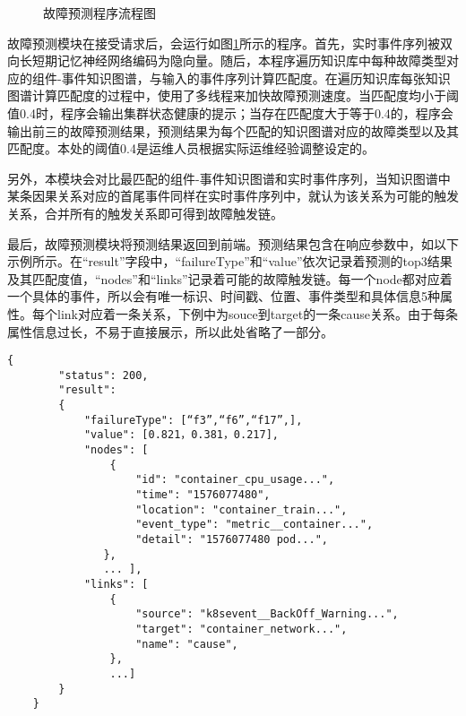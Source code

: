\begin{figure}[H]
    \centering
    \caption{故障预测程序流程图\label{failure-predict-process}}
\end{figure}

故障预测模块在接受请求后，会运行如图\ref{failure-predict-process}所示的程序。首先，实时事件序列被双向长短期记忆神经网络编码为隐向量。随后，本程序遍历知识库中每种故障类型对应的组件-事件知识图谱，与输入的事件序列计算匹配度。在遍历知识库每张知识图谱计算匹配度的过程中，使用了多线程来加快故障预测速度。当匹配度均小于阈值0.4时，程序会输出集群状态健康的提示；当存在匹配度大于等于0.4的，程序会输出前三的故障预测结果，预测结果为每个匹配的知识图谱对应的故障类型以及其匹配度。本处的阈值0.4是运维人员根据实际运维经验调整设定的。

另外，本模块会对比最匹配的组件-事件知识图谱和实时事件序列，当知识图谱中某条因果关系对应的首尾事件同样在实时事件序列中，就认为该关系为可能的触发关系，合并所有的触发关系即可得到故障触发链。

最后，故障预测模块将预测结果返回到前端。预测结果包含在响应参数中，如以下示例所示。在“result”字段中，“failureType”和“value”依次记录着预测的top3结果及其匹配度值，“nodes”和“links”记录着可能的故障触发链。每一个node都对应着一个具体的事件，所以会有唯一标识、时间戳、位置、事件类型和具体信息5种属性。每个link对应着一条关系，下例中为souce到target的一条cause关系。由于每条属性信息过长，不易于直接展示，所以此处省略了一部分。
\begin{lstlisting}[xleftmargin=6em]
    {
        "status": 200,
        "result": 
        {
            "failureType": [“f3”,“f6”,“f17”,],
            "value": [0.821，0.381，0.217],
            "nodes": [ 
                {
                    "id": "container_cpu_usage...",
                    "time": "1576077480",
                    "location": "container_train...",
                    "event_type": "metric__container...",
                    "detail": "1576077480 pod...",
               }, 
               ... ],
            "links": [ 
                {
                    "source": "k8sevent__BackOff_Warning...",
                    "target": "container_network...",
                    "name": "cause",
                },
                ...]
        }
    }
\end{lstlisting}

